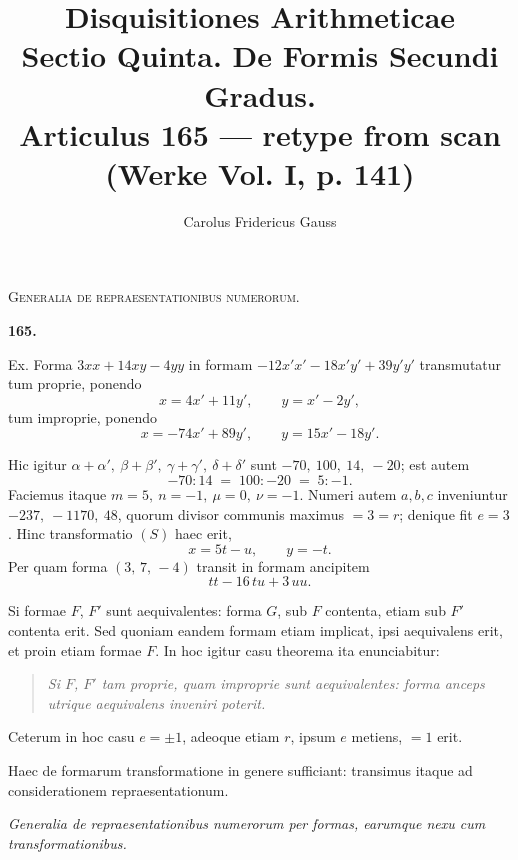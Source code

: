 \documentclass[12pt,a4paper]{article}
\title{Disquisitiones Arithmeticae\\[0.4em]
\large Sectio Quinta. De Formis Secundi Gradus.\\
Articulus 165 --- retype from scan (Werke Vol. I, p. 141)}
\author{Carolus Fridericus Gauss}
\date{}
\begin{document}
\maketitle
{}

\begin{center}
\textsc{Generalia de repraesentationibus numerorum.}
\end{center}

\bigskip

\noindent\textbf{165.}

\medskip

Ex. Forma $3xx + 14xy - 4yy$ in formam $-12x'x' - 18x'y' + 39y'y'$
transmutatur tum proprie, ponendo
\[
  x = 4x' + 11y', \qquad y = x' - 2y',
\]
tum improprie, ponendo
\[
  x = -74x' + 89y', \qquad y = 15x' - 18y'.
\]

Hic igitur $\alpha + \alpha',\ \beta + \beta',\ \gamma + \gamma',\ \delta + \delta'$
sunt $-70,\ 100,\ 14,\ -20$; est autem
\[
  -70 : 14 \;=\; 100 : -20 \;=\; 5 : -1.
\]
Faciemus itaque $m = 5,\ n = -1,\ \mu = 0,\ \nu = -1$.
Numeri autem $a, b, c$ inveniuntur $-237,\ -1170,\ 48$, quorum
divisor communis maximus $= 3 = r$; denique fit $e = 3$.
Hinc transformatio $(S)$ haec erit,
\[
  x = 5t - u, \qquad y = -t.
\]
Per quam forma $(3,\,7,\,-4)$ transit in formam ancipitem
\[
  tt - 16\,tu + 3\,uu.
\]

\bigskip

Si formae $F$, $F'$ sunt aequivalentes: forma $G$, sub $F$ contenta,
etiam sub $F'$ contenta erit. Sed quoniam eandem formam etiam implicat,
ipsi aequivalens erit, et proin etiam formae $F$.
In hoc igitur casu theorema ita enunciabitur:
\begin{quote}
\textit{Si $F$, $F'$ tam proprie, quam improprie sunt aequivalentes:
forma anceps utrique aequivalens inveniri poterit.}
\end{quote}
Ceterum in hoc casu $e = \pm 1$, adeoque etiam $r$, ipsum $e$ metiens,
$= 1$ erit.

\bigskip

Haec de formarum transformatione in genere sufficiant: transimus itaque
ad considerationem repraesentationum.

\bigskip
\begin{center}
\textit{Generalia de repraesentationibus numerorum per formas, earumque
nexu cum transformationibus.}
\end{center}
\end{document}
